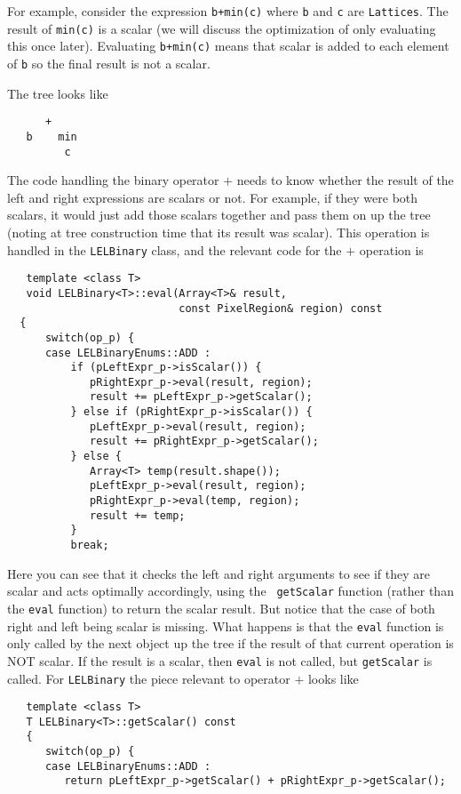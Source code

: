 For example, consider the expression {\tt b+min(c)} where {\tt b} and {\tt c} are
{\tt Lattices}.  The result of {\tt min(c)} is a scalar (we will discuss the
optimization of only evaluating this once later).  Evaluating
{\tt b+min(c)} means that scalar is added to each element of {\tt b} so the
final result is not a scalar. 

The tree looks like

\begin{verbatim}
      +
   b    min
         c
\end{verbatim}

The code handling the binary operator $+$ needs to know whether the
result of the left and right expressions are scalars or not.  For
example, if they were both scalars, it would just add those scalars
together and pass them on up the tree (noting at tree construction time
that its result was scalar).  This operation is handled in the {\tt LELBinary}
class, and the relevant code for the $+$ operation is

\begin{verbatim}
   template <class T>
   void LELBinary<T>::eval(Array<T>& result,
                           const PixelRegion& region) const
  {
      switch(op_p) {
      case LELBinaryEnums::ADD :
          if (pLeftExpr_p->isScalar()) {
             pRightExpr_p->eval(result, region);
             result += pLeftExpr_p->getScalar();
          } else if (pRightExpr_p->isScalar()) {
             pLeftExpr_p->eval(result, region);
             result += pRightExpr_p->getScalar();
          } else {
             Array<T> temp(result.shape());
             pLeftExpr_p->eval(result, region);
             pRightExpr_p->eval(temp, region);
             result += temp;
          }
          break;
\end{verbatim}


Here you can see that it checks the left and right arguments to see if
they are scalar and acts optimally accordingly, using the {\tt
getScalar} function (rather than the {\tt eval} function) to return the
scalar result.  But notice that the case of both right and left being
scalar is missing.  What happens is that the {\tt eval} function is only
called by the next object up the tree if the result of that current
operation is NOT scalar.  If the result is a scalar, then {\tt eval} is
not called, but {\tt getScalar} is called.  For {\tt LELBinary} the
piece relevant to operator $+$ looks like

\begin{verbatim}
   template <class T>
   T LELBinary<T>::getScalar() const
   {
      switch(op_p) {
      case LELBinaryEnums::ADD :
         return pLeftExpr_p->getScalar() + pRightExpr_p->getScalar();
\end{verbatim}


